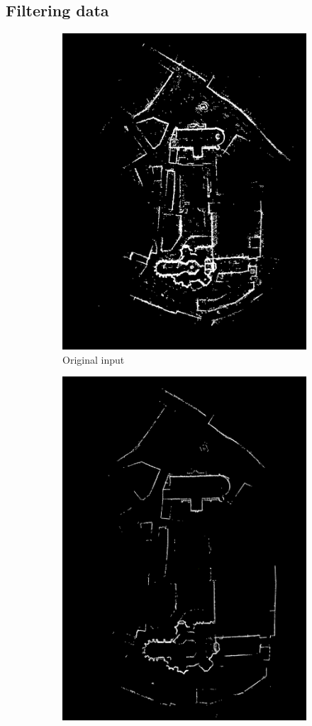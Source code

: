 \documentclass[10pt,twocolumn,letterpaper]{article}
\begin{document}
\subsection{Filtering data}


\begin{figure}

\begin{subfigure}{.5\linewidth}
  \centering
  \includegraphics[width=.8\linewidth]{images/Selection_031.png}
  \caption{Original input}
  \label{fig:sfig1}
\end{subfigure}%
\begin{subfigure}{.5\linewidth}
  \centering
  \includegraphics[width=.8\linewidth]{images/Selection_032.png}

\end{subfigure}
\end{figure}
\end{document}
